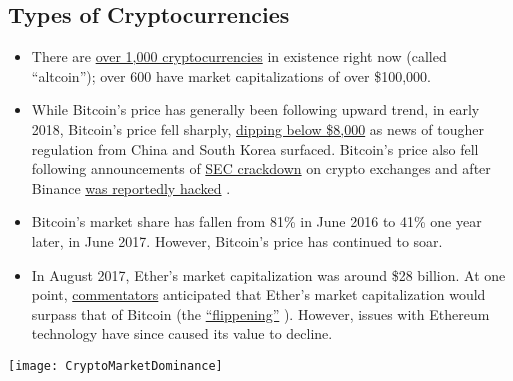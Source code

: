 \documentclass[11pt,fleqn]{book} %
\begin{document}
	\subsection{Types of Cryptocurrencies}
		\begin{itemize}
			\item There are \href{https://coinmarketcap.com/all/views/all/}{over 1,000 cryptocurrencies} \cite{coinmarketcapAll} 
			in existence right now (called ``altcoin''); 
			over 600 have market capitalizations of over \$100,000.
			\item While Bitcoin’s price has generally been following upward trend, in early 2018, Bitcoin’s price fell sharply, 
			\href{https://www.cnbc.com/2018/02/05/bitcoin-price-drops-below-8000-over-60-billion-wiped-off-cryptocurrencies.html}{dipping below \$8,000} 
			\cite{cnbcBitcoinPriceSurge}
			as news of tougher regulation from China and South Korea surfaced. Bitcoin's price also fell 
			following announcements of \href{http://www.latimes.com/business/la-fi-bitcoin-sec-registration-20180307-story.html}{SEC crackdown} 
			\cite{laTimes}
			on crypto exchanges and after Binance 
			\href{https://www.ft.com/content/58a32050-22aa-11e8-add1-0e8958b189ea}{was reportedly hacked}
			\cite{ftBinanceHack}.
			\item Bitcoin’s market share has fallen from 81\% in June 2016 to 41\% one year later, in June 2017. 
			However, Bitcoin’s price has continued to soar.
			\item In August 2017, Ether’s market capitalization was around \$28 billion. At one point, 
			\href{http://www.zerohedge.com/news/2017-05-31/ethereum-forecast-surpass-bitcoin-2018}{commentators} \cite{zeroHedge}
			anticipated that Ether’s market 
			capitalization would surpass that of Bitcoin (the 
			\href{https://www.flippening.watch/}{``flippening''} \cite{flippening}). 
			However, issues with Ethereum technology have since caused its value to decline.
		\end{itemize}
		\begin{center}
			\texttt{[image: CryptoMarketDominance]}
		\end{center}
\end{document}
